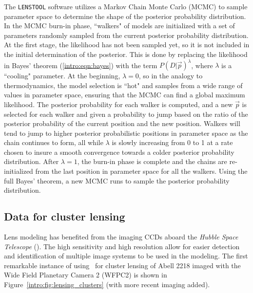 The \texttt{LENSTOOL} software utilizes a Markov Chain Monte Carlo (MCMC) to sample parameter space to determine the shape of the posterior probability distribution. In the MCMC burn-in phase, ``walkers" of models are initialized with a set of parameters randomly sampled from the current posterior probability distribution. At the first stage, the likelihood has not been sampled yet, so it is not included in the initial determination of the posterior. This is done by replacing the likelihood in Bayes' theorem (\ref{intro:eqn:bayes}) with the term $P(D | \vec{p} )^\lambda$, where $\lambda$ is a ``cooling" parameter. At the beginning, $\lambda=0$, so in the analogy to thermodynamics, the model selection is ``hot" and samples from a wide range of values in parameter space, ensuring that the MCMC can find a global maximum likelihood. The posterior probability for each walker is computed, and a new $\vec{p}$ is selected for each walker and given a probability to jump based on the ratio of the posterior probability of the current position and the new position. Walkers will tend to jump to higher posterior probabilistic positions in parameter space as the chain continues to form, all while $\lambda$ is slowly increasing from 0 to 1 at a rate chosen to insure a smooth convergence towards a colder posterior probability distribution. After $\lambda=1$, the burn-in phase is complete and the chains are re-initialized from the last position in parameter space for all the walkers. Using the full Bayes' theorem, a new MCMC runs to sample the posterior probability distribution.

\subsection{Data for cluster lensing}

Lens modeling has benefited from the imaging CCDs aboard the {\it Hubble Space Telescope} (\hst). The high sensitivity and high resolution allow for easier detection and identification of multiple image systems to be used in the modeling. The first remarkable instance of using \hst\ for cluster lensing of Abell 2218 \citep{Kneib:1996kb} imaged with the Wide Field Planetary Camera 2 (WFPC2) is shown in Figure~\ref{intro:fig:lensing_clusters} (with more recent imaging added). 

